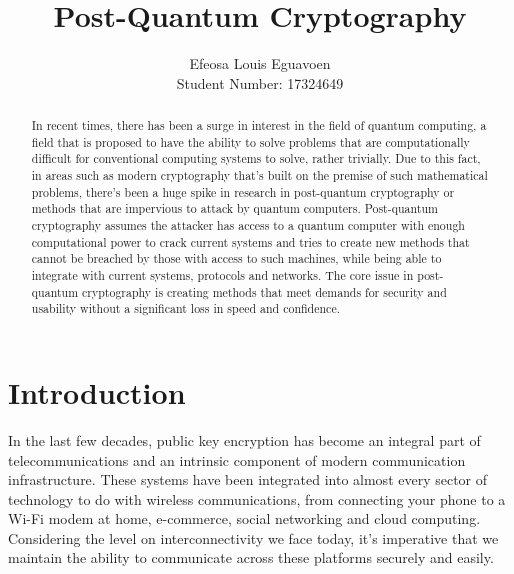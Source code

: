 \documentclass[10pt,a4paper]{IEEEtran}
\author{Efeosa Louis Eguavoen \\ Student Number: 
17324649}
\title{Post-Quantum Cryptography}
\begin{document}
\maketitle
\begin{abstract}
In recent times, there has been a surge in interest in the field of quantum computing, a field that is proposed to have the ability to solve problems that are computationally difficult for conventional computing systems to solve, rather trivially. Due to this fact, in areas such as modern cryptography that's built on the premise of such mathematical problems, there's been a huge spike in research in post-quantum cryptography or methods that are impervious to attack by quantum computers. Post-quantum cryptography assumes the attacker has access to a quantum computer with enough computational power to crack current systems and tries to create new methods that cannot be breached by those with access to such machines, while being able to integrate with current systems, protocols and networks. The core issue in post-quantum cryptography is creating methods that meet demands for security and usability without a significant loss in speed and confidence.
\end{abstract} 
\section{Introduction}
In the last few decades, public key encryption has become an integral part of telecommunications and an intrinsic component of modern communication infrastructure. These systems have been integrated into almost every sector of technology to do with wireless communications, from connecting your phone to a Wi-Fi modem at home, e-commerce, social networking and cloud computing. Considering the level on interconnectivity we face today, it's imperative that we maintain the ability to communicate across these platforms securely and easily.
\newline
\newline
\end{document}
